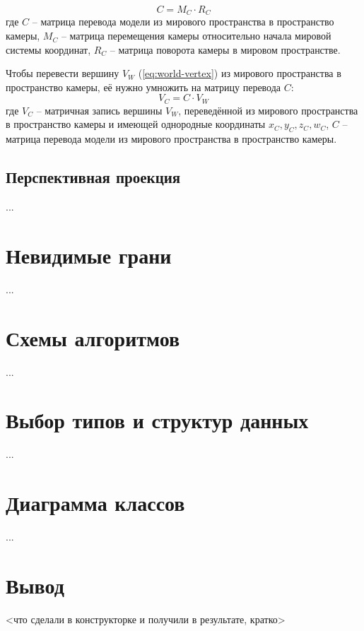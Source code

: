 \begin{equation}
	C = M_C \cdot R_C
\end{equation}
где $C$ -- матрица перевода модели из мирового пространства в пространство камеры, $M_C$ -- матрица перемещения камеры относительно начала мировой системы координат, $R_C$ -- матрица поворота камеры в мировом пространстве.

Чтобы перевести вершину $V_W$ (\ref{eq:world-vertex}) из мирового пространства в пространство камеры, её нужно умножить на матрицу перевода $C$:
\begin{equation}
	V_C = C \cdot V_W
\end{equation}
где $V_C$ -- матричная запись вершины $V_W$, переведённой из мирового пространства в пространство камеры и имеющей однородные координаты $x_C, y_C, z_C, w_C$, $C$ -- матрица перевода модели из мирового пространства в пространство камеры. 

\subsection{Перспективная проекция}

...

\section{Невидимые грани}

...

\section{Схемы алгоритмов}

...

\section{Выбор типов и структур данных}

...

\section{Диаграмма классов}

...

\section{Вывод}

<что сделали в конструкторке и получили в результате, кратко>

\clearpage
